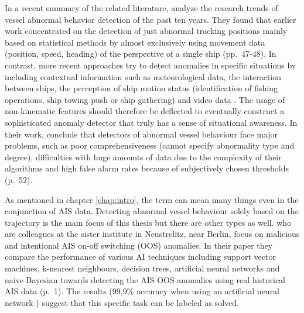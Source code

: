 \par 
In a recent summary of the related literature, \cite{zhang2020analysis} analyze the research trends of vessel abnormal behavior detection of the past ten years. They found that earlier work concentrated on the detection of just abnormal tracking positions mainly based on statistical methods by almost exclusively using movement data (position, speed, heading) of the perspective of a single ship (pp.~47-48). In contrast, more recent approaches try to detect anomalies in specific situations by including contextual information such as meteorological data, the interaction between ships, the perception of ship motion status (identification of fishing operations, ship towing push or ship gathering) and video data \cite[p.~50]{zhang2020analysis}. The usage of non-kinematic features should therefore be deflected to eventually construct a sophisticated anomaly detector that  truly has a sense of situational awareness. In their work, \cite{zhang2020analysis} conclude that detectors of abnormal vessel behaviour face major problems, such as poor comprehensiveness (cannot specify abnormality type and degree), difficulties with huge amounts of data due to the complexity of their algorithms and high false alarm rates because of subjectively chosen thresholds (p.~52).
\par 
As mentioned in chapter \ref{chap:intro}, the term  can mean many things even in the conjunction of AIS data. Detecting abnormal vessel behaviour solely based on the trajectory is the main focus of this thesis but there are other types as well. \cite{singh2020effectiveness} who are colleagues at the sister institute in Neustrelitz, near Berlin, focus on malicious and intentional AIS on-off switching (OOS) anomalies. In their paper they compare the performance of various AI techniques including support vector machines, k-nearest neighbours, decision trees, artificial neural networks and naive Bayesian towards detecting the AIS
OOS anomalies using real historical AIS data (p.~1). The results (99,9\% accuracy when using an artificial neural network \cite[p.~7]{singh2020effectiveness}) suggest that this specific task can be labeled as solved. 


